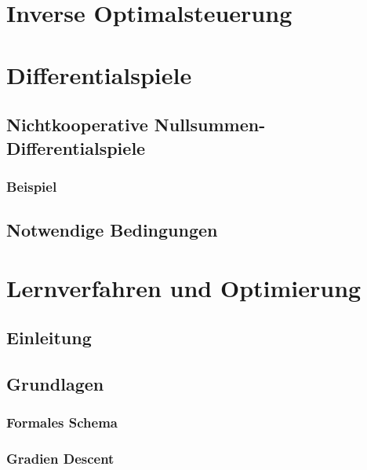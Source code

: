 	\section{Inverse Optimalsteuerung} %

	\section{Differentialspiele} %

		\subsection{Nichtkooperative Nullsummen-Differentialspiele} %

			\subsubsection{Beispiel} %

		\subsection{Notwendige Bedingungen} %

	\section{Lernverfahren und Optimierung} %

		\subsection{Einleitung} %

		\subsection{Grundlagen} %

			\subsubsection{Formales Schema} %

			\subsubsection{Gradien Descent} %

